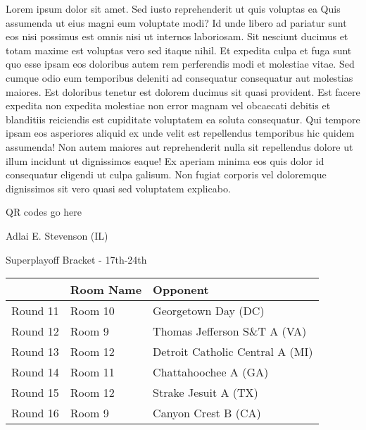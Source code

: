 \documentclass{article}%
\begin{document}
\vspace*{8pt}%
\linebreak%
\newline%
\newline%
    Lorem ipsum dolor sit amet. Sed iusto reprehenderit ut quis voluptas ea Quis assumenda ut eius magni eum voluptate modi? Id unde libero ad pariatur sunt eos nisi possimus est omnis nisi ut internos laboriosam. Sit nesciunt ducimus et totam maxime est voluptas vero sed itaque nihil. Et expedita culpa et fuga sunt quo esse ipsam eos doloribus autem rem perferendis modi et molestiae vitae.\newline%
\newline%
    Sed cumque odio eum temporibus deleniti ad consequatur consequatur aut molestias maiores. Est doloribus tenetur est dolorem ducimus sit quasi provident. Est facere expedita non expedita molestiae non error magnam vel obcaecati debitis et blanditiis reiciendis est cupiditate voluptatem ea soluta consequatur. Qui tempore ipsam eos asperiores aliquid ex unde velit est repellendus temporibus hic quidem assumenda!\newline%
\newline%
    Non autem maiores aut reprehenderit nulla sit repellendus dolore ut illum incidunt ut dignissimos eaque! Ex aperiam minima eos quis dolor id consequatur eligendi ut culpa galisum. Non fugiat corporis vel doloremque dignissimos sit vero quasi sed voluptatem explicabo.\newline%
\newline%
\vspace*{30pt}%
\begin{center}%
\begin{Huge}%
QR codes go here%
\end{Huge}%
\end{center}%
\newpage%
\begin{center}%
\begin{Huge}%
Adlai E. Stevenson (IL)%
\end{Huge}%
\vspace*{8pt}%
\linebreak%
\begin{Large}%
Superplayoff Bracket {-} 17th{-}24th%
\end{Large}%
\end{center}%
%
\begin{tabularx}{\textwidth}{|c|Y|Y|}%
\hline%
&Room Name&Opponent\\%
\hline%
Round 11&Room 10&Georgetown Day (DC)\\%
Round 12&Room 9&Thomas Jefferson S\&T A (VA)\\%
Round 13&Room 12&Detroit Catholic Central A (MI)\\%
Round 14&Room 11&Chattahoochee A (GA)\\%
Round 15&Room 12&Strake Jesuit A (TX)\\%
Round 16&Room 9&Canyon Crest B (CA)\\%
\hline%
\end{tabularx}%
\end{document}
